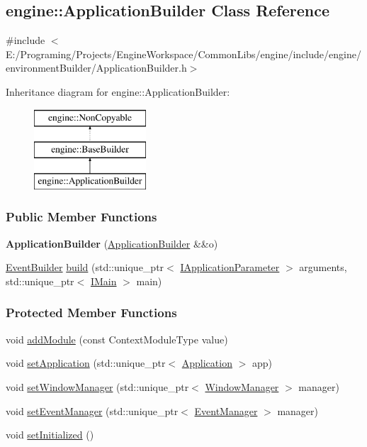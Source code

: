 \hypertarget{a00003}{}\subsection{engine\+:\+:Application\+Builder Class Reference}
\label{a00003}


{\ttfamily \#include $<$E\+:/\+Programing/\+Projects/\+Engine\+Workspace/\+Common\+Libs/engine/include/engine/environment\+Builder/\+Application\+Builder.\+h$>$}

Inheritance diagram for engine\+:\+:Application\+Builder\+:\begin{figure}[H]
\begin{center}
\leavevmode
\includegraphics[height=3.000000cm]{a00003}
\end{center}
\end{figure}
\subsubsection*{Public Member Functions}
\begin{DoxyCompactItemize}
\item 
{\bfseries Application\+Builder} (\hyperlink{a00003}{Application\+Builder} \&\&o)\hypertarget{a00003_a9129ac9644ef145a394c99d59c035307}{}\label{a00003_a9129ac9644ef145a394c99d59c035307}

\item 
\hyperlink{a00031}{Event\+Builder} \hyperlink{a00003_a7ca2bdeae296ff836f6592b66d819e87}{build} (std\+::unique\+\_\+ptr$<$ \hyperlink{a00043}{I\+Application\+Parameter} $>$ arguments, std\+::unique\+\_\+ptr$<$ \hyperlink{a00045}{I\+Main} $>$ main)
\end{DoxyCompactItemize}
\subsubsection*{Protected Member Functions}
\begin{DoxyCompactItemize}
\item 
void \hyperlink{a00005_a52fb449fadc5d3a074e3fc7bfb56744b}{add\+Module} (const Context\+Module\+Type value)
\item 
void \hyperlink{a00005_a20c5dafa6892142bc352c13a5f3ac09a}{set\+Application} (std\+::unique\+\_\+ptr$<$ \hyperlink{a00002}{Application} $>$ app)
\item 
void \hyperlink{a00005_a641fb06484bdb07220f445f14db8c0e7}{set\+Window\+Manager} (std\+::unique\+\_\+ptr$<$ \hyperlink{a00087}{Window\+Manager} $>$ manager)
\item 
void \hyperlink{a00005_a52b490a3ef4d2a5b5b7e8e0f82d9a27c}{set\+Event\+Manager} (std\+::unique\+\_\+ptr$<$ \hyperlink{a00034}{Event\+Manager} $>$ manager)
\item 
void \hyperlink{a00005_af23e3bdfb30ca9f2076cacc9029d96c2}{set\+Initialized} ()
\end{DoxyCompactItemize}
